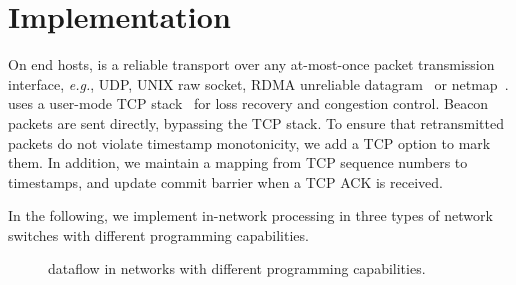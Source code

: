 \section{Implementation}
\label{sec:impl}

On end hosts, \sys is a reliable transport over any at-most-once packet transmission interface, \textit{e.g.}, UDP, UNIX raw socket, RDMA unreliable datagram~\cite{infinibandrocev2} or netmap~\cite{rizzo2012netmap}.
\sys uses a user-mode TCP stack~\cite{dunkels2001design} for loss recovery and congestion control.
Beacon packets are sent directly, bypassing the TCP stack.
To ensure that retransmitted packets do not violate timestamp monotonicity, we add a TCP option to mark them.
In addition, we maintain a mapping from TCP sequence numbers to timestamps, and update commit barrier when a TCP ACK is received.

In the following, we implement in-network processing in three types of network switches with different programming capabilities.

\begin{figure}[t]
\centering
{}
\hspace{0.04\textwidth}
\hspace{0.04\textwidth}
\caption{\sys dataflow in networks with different programming capabilities.}
\label{fig:impl}
\vspace{-1em}
\end{figure}

